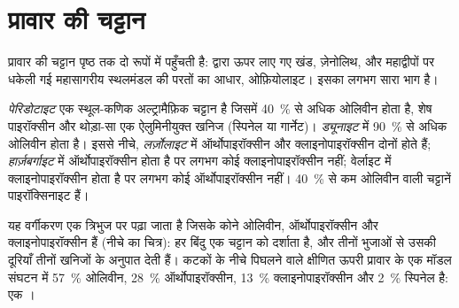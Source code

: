 \section{प्रावार की चट्टान}\label{sec:b2:mantle-melting:rock}

प्रावार की चट्टान पृष्ठ तक दो रूपों में पहुँचती है:  द्वारा ऊपर लाए गए खंड,
ज़ेनोलिथ, और महाद्वीपों पर धकेली गई महासागरीय स्थलमंडल की परतों का आधार,
ओफ़ियोलाइट। इसका लगभग सारा भाग  है।

\begin{definition}[पेरिडोटाइट और उसके प्रकार]\label{def:b2:mantle-melting:peridotites}
\emph{पेरिडोटाइट} एक स्थूल-कणिक अल्ट्रामैफ़िक चट्टान है
जिसमें \qty{40}{\percent} से अधिक ओलिवीन होता है, शेष पाइरॉक्सीन और
थोड़ा-सा एक ऐलुमिनीयुक्त खनिज (स्पिनेल या गार्नेट)। \emph{ड्यूनाइट}
में \qty{90}{\percent} से अधिक ओलिवीन होता है। इससे नीचे,
\emph{लर्ज़ोलाइट} में ऑर्थोपाइरॉक्सीन और क्लाइनोपाइरॉक्सीन दोनों होते हैं;
\emph{हार्ज़बर्गाइट} में ऑर्थोपाइरॉक्सीन होता है पर
लगभग कोई क्लाइनोपाइरॉक्सीन नहीं; वेर्लाइट में क्लाइनोपाइरॉक्सीन होता है पर लगभग कोई
ऑर्थोपाइरॉक्सीन नहीं। \qty{40}{\percent} से कम ओलिवीन वाली चट्टानें पाइरॉक्सिनाइट हैं।
\end{definition}

यह वर्गीकरण एक त्रिभुज पर पढ़ा जाता है जिसके कोने ओलिवीन,
ऑर्थोपाइरॉक्सीन और क्लाइनोपाइरॉक्सीन हैं (नीचे का चित्र): हर बिंदु एक चट्टान को दर्शाता है,
और तीनों भुजाओं से उसकी दूरियाँ तीनों खनिजों के अनुपात देती हैं।
कटकों के नीचे पिघलने वाले क्षीणित ऊपरी प्रावार के एक मॉडल संघटन में
\qty{57}{\percent} ओलिवीन,
\qty{28}{\percent} ऑर्थोपाइरॉक्सीन, \qty{13}{\percent} क्लाइनोपाइरॉक्सीन और
\qty{2}{\percent} स्पिनेल है: एक ।

